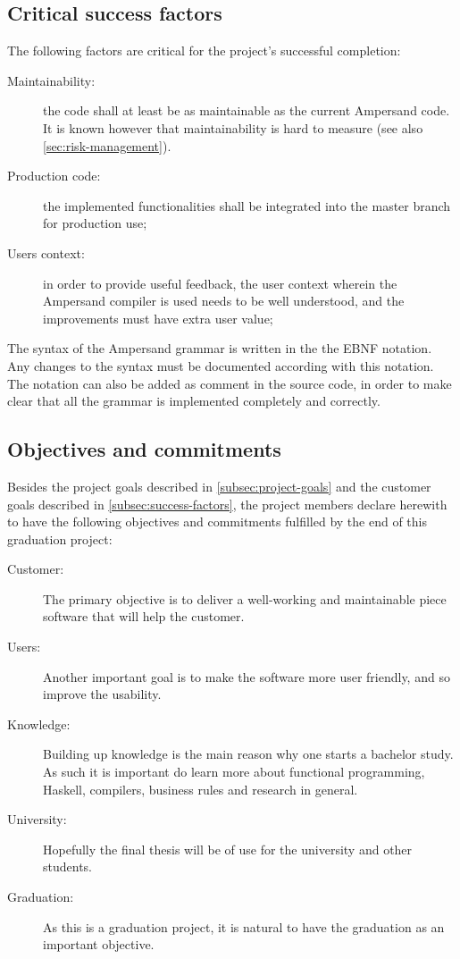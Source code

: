 \subsection{Critical success factors}
\label{subsec:success-factors}
The following factors are critical for the project's successful completion:
\begin{description}
	\item[Maintainability:] the code shall at least be as maintainable as the current Ampersand code.
		It is known however that maintainability is hard to measure (see also \autoref{sec:risk-management}).
	\item[Production code:] the implemented functionalities shall be integrated into the master branch for production use;
	\item[Users context:] in order to provide useful feedback, the user context wherein the Ampersand compiler is used needs to be well understood, and the improvements must have extra user value;
\end{description}
%
The syntax of the Ampersand grammar is written in the the EBNF notation.
Any changes to the syntax must be documented according with this notation.
The notation can also be added as comment in the source code, in order to make clear that all the grammar is implemented completely and correctly.

\subsection{Objectives and commitments}
Besides the project goals described in \autoref{subsec:project-goals} and the customer goals described in \autoref{subsec:success-factors}, the project members declare herewith to have the following objectives and commitments fulfilled by the end of this graduation project:
\begin{description}
	\item[Customer:] The primary objective is to deliver a well-working and maintainable piece software that will help the customer.
	\item[Users:] Another important goal is to make the software more user friendly, and so improve the usability.
	\item[Knowledge:] Building up knowledge is the main reason why one starts a bachelor study.
		As such it is important do learn more about functional programming, Haskell, compilers, business rules and research in general.
	\item[University:] Hopefully the final thesis will be of use for the university and other students.
	\item[Graduation:] As this is a graduation project, it is natural to have the graduation as an important objective.
\end{description}
